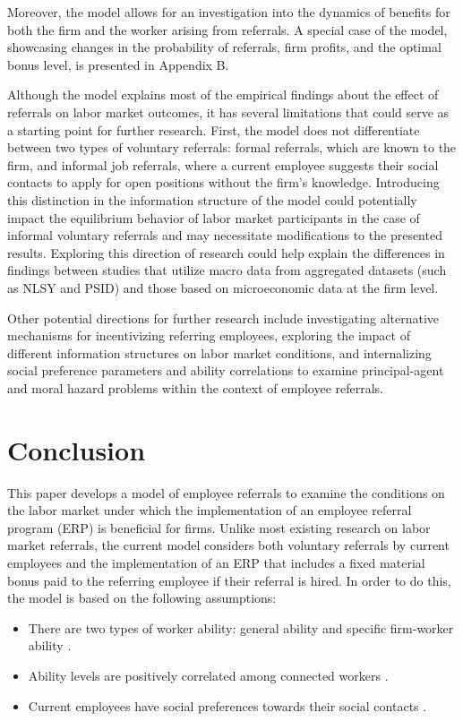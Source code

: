 \documentclass[12pt]{article}
\begin{document}
Moreover, the model allows for an investigation into the dynamics of benefits for both the firm and the worker arising from referrals. A special case of the model, showcasing changes in the probability of referrals, firm profits, and the optimal bonus level, is presented in Appendix B.

Although the model explains most of the empirical findings about the effect of referrals on labor market outcomes, it has several limitations that could serve as a starting point for further research. First, the model does not differentiate between two types of voluntary referrals: formal referrals, which are known to the firm, and informal job referrals, where a current employee suggests their social contacts to apply for open positions without the firm's knowledge. Introducing this distinction in the information structure of the model could potentially impact the equilibrium behavior of labor market participants in the case of informal voluntary referrals and may necessitate modifications to the presented results. Exploring this direction of research could help explain the differences in findings between studies that utilize macro data from aggregated datasets (such as NLSY and PSID) and those based on microeconomic data at the firm level. 

Other potential directions for further research include investigating alternative mechanisms for incentivizing referring employees, exploring the impact of different information structures on labor market conditions, and internalizing social preference parameters and ability correlations to examine principal-agent and moral hazard problems within the context of employee referrals.

\section{Conclusion} \label{sec:conclusion}

This paper develops a model of employee referrals to examine the conditions on the labor market under which the implementation of an employee referral program (ERP) is beneficial for firms. Unlike most existing research on labor market referrals, the current model considers both voluntary referrals by current employees and the implementation of an ERP that includes a fixed material bonus paid to the referring employee if their referral is hired. In order to do this, the model is based on the following assumptions:
\begin{itemize}
    \item There are two types of worker ability: general ability and specific firm-worker ability \citep{becker1962investment, becker1975investment, gibbons2004task, lazear2009firm}. 
    \item Ability levels are positively correlated among connected workers \citep{montgomery1991social}.
    \item Current employees have social preferences towards their social contacts \citep{bandiera2009social, friebel2023employee}.
\end{itemize}
\end{document}
